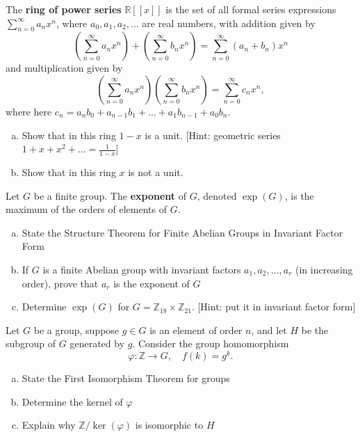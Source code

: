 \documentclass[11pt]{exam}
\theoremstyle{definition}
\begin{document}
\begin{questions}
\newpage
\question[10]\mbox{}

The \textbf{ring of power series} $\mathbb R[[x]]$ is the set of all formal series expressions $\sum_{n=0}^\infty a_nx^n$, where $a_0,a_1,a_2,\dots$ are real numbers, with addition given by
$$\left(\sum_{n=0}^\infty a_nx^n\right) + \left(\sum_{n=0}^\infty b_nx^n\right) = \sum_{n=0}^\infty (a_n+b_n)x^n$$
and multiplication given by
$$\left(\sum_{n=0}^\infty a_nx^n\right) \left(\sum_{n=0}^\infty b_nx^n\right) = \sum_{n=0}^\infty c_nx^n,$$
where here $c_n = a_nb_0 + a_{n-1}b_1 + \dots + a_1b_{n-1} + a_0b_n$.
\begin{enumerate}[(a)]
\item Show that in this ring $1-x$ is a unit.  [Hint: geometric series $1+x+x^2+\dots=\frac{1}{1-x}$]
\vspace{2in}
\item Show that in this ring $x$ is not a unit.
\end{enumerate}


\newpage
\question[10]\mbox{}
Let $G$ be a finite group.
The \textbf{exponent} of $G$, denoted $\exp(G)$, is the maximum of the orders of elements of $G$.
\begin{enumerate}[(a)]
\item State the Structure Theorem for Finite Abelian Groups in Invariant Factor Form
\vspace{2in}
\item If $G$ is a finite Abelian group with invariant factors $a_1,a_2,\dots, a_r$ (in increasing order), prove that $a_r$ is the exponent of $G$
\vspace{4in}
\item Determine $\exp(G)$ for $G=\mathbb{Z}_{18}\times\mathbb{Z}_{21}$. [Hint: put it in invariant factor form]
\end{enumerate}

\newpage
\question[10]\mbox{}

Let $G$ be a group, suppose $g\in G$ is an element of order $n$, and let $H$ be the subgroup of $G$ generated by $g$.
Consider the group homomorphism
$$\varphi: \mathbb Z\rightarrow G,\quad f(k) = g^k.$$
\begin{enumerate}[(a)]
\item State the First Isomorphism Theorem for groups
\vspace{2in}
\item Determine the kernel of $\varphi$
\vspace{2in}
\item Explain why $\mathbb Z/\ker(\varphi)$ is isomorphic to $H$
\end{enumerate}



\end{questions}
\end{document}
